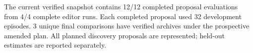 The current verified snapshot contains 12/12 completed proposal evaluations from 4/4 complete editor runs. Each completed proposal used 32 development episodes. 3 unique final comparisons have verified archives under the prospective amended plan. All planned discovery proposals are represented; held-out estimates are reported separately.
